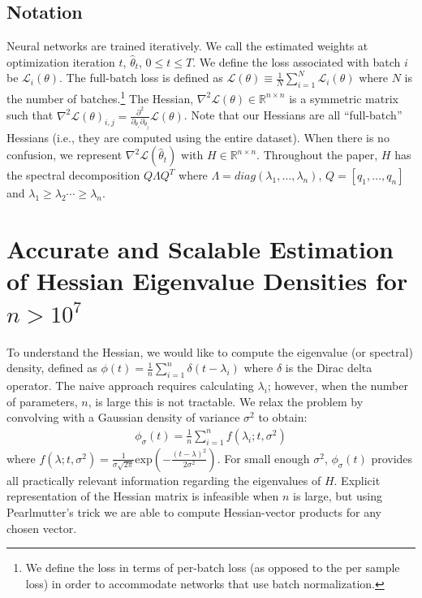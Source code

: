 \documentclass{article}
\newcommand{\expn}[1]{\mathrm{exp}\left(#1\right)}
\newcommand{\R}{\mathbb{R}}
\newcommand{\phis}{\phi_{\sigma}}
\newcommand{\loss}{\mathcal{L}}
\newcommand{\hess}{\nabla^2 \loss}
\begin{document}
\subsection{Notation}
Neural networks are trained iteratively. We call the estimated weights at optimization iteration $t$, $\hat{\theta}_t$, $0 \leq t \leq T$. We define the loss associated with batch $i$ be $\loss_i(\theta)$. The full-batch loss is defined as $\loss(\theta) \equiv \frac{1}{N}\sum_{i=1}^N \loss_i(\theta)$ where $N$ is the number of batches.\footnote{We define the loss in terms of per-batch loss (as opposed to the per sample loss) in order to accommodate networks that use batch normalization.} The Hessian, $\nabla^2 \loss(\theta) \in \R^{n \times n}$ is a symmetric matrix such that 
$\hess(\theta)_{i, j} = \frac{\partial^2}{\partial_{\theta_i}\partial_{\theta_j}} \loss(\theta)$.
Note that our Hessians are all ``full-batch'' Hessians (i.e., they are computed using the entire dataset). When there is no confusion, we represent $\nabla^2 \loss(\hat{\theta}_t)$ with $H\in \R^{n\times n}$. Throughout the paper, $H$ has the spectral decomposition $Q \Lambda Q^T$ where $\Lambda = diag(\lambda_1,\dots, \lambda_n)$, $Q=[q_1, \dots, q_n]$ and $\lambda_1 \geq \lambda_2 \cdots \geq \lambda_n$. 

\section{Accurate and Scalable Estimation of Hessian Eigenvalue Densities for $n > 10^7$}
\label{sec:tools}

To understand the Hessian, we would like to compute the eigenvalue (or spectral) density, defined as $\phi(t) = \frac{1}{n} \sum_{i=1}^n \delta(t - \lambda_i)$ where $\delta$ is the Dirac delta operator. The naive approach requires calculating $\lambda_i$; however, when the number of parameters, $n$, is large this is not tractable. We relax the problem by convolving with a Gaussian density of variance $\sigma^2$ to obtain:
\begin{align}\label{eqn:smoothed_density}
  \phis(t) = \frac{1}{n} \sum_{i=1}^n f(\lambda_i; t, \sigma^2)
\end{align}
where $f(\lambda; t, \sigma^2) =\frac{1}{\sigma \sqrt{2 \pi}} \expn{- \frac{(t - \lambda)^2}{2 \sigma^2}}.$ 
For small enough $\sigma^2$, $\phis(t)$ provides all practically relevant information regarding the eigenvalues of $H$. Explicit representation of the Hessian matrix is infeasible when $n$ is large, but using Pearlmutter's trick \cite{pearlmutter1994fast} we are able to compute Hessian-vector products for any chosen  vector. 
\end{document}
